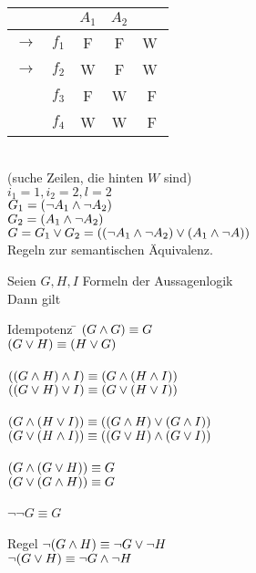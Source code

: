 \beispiel{}\\
\begin{tabular}{cc|c|c|c}
 &  & $A_1$ & $A_2$ &   \\
\hline
$\rightarrow$ & $f_1$ & F & F & \textcircled{W}\\
$\rightarrow$ & $f_2$ & W & F & \textcircled{W}\\
 & $f_3$ & F & W & F\\
 & $f_4$ & W & W & F\\
\end{tabular}\\
(suche Zeilen, die hinten $W$ sind)\\

\noindent
$i_1 = 1, i_2 = 2, l=2$\\
$G_1 = (\neg A_1 \wedge \neg A_2)$\\
$G_2 = (A_1 \wedge \neg A_2)$\\
$G = G_1 \vee G_2 = (( \neg A_1 \wedge \neg A_2) \vee (A_1 \wedge \neg A))$\\

\vspace{1cm}
\noindent
Regeln zur semantischen Äquivalenz.

 Seien $G, H, I$ Formeln der Aussagenlogik\\
Dann gilt
\begin{tabbing}
Idempotenz \hspace{1cm} \= $(G \wedge G) \equiv G$\\
\> $(G \vee H) \equiv (H \vee G)$\\
\\
 \> $((G \wedge H) \wedge I ) \equiv (G \wedge (H \wedge I))$\\
\> $((G \vee H) \vee I) \equiv (G \vee (H \vee I ))$\\
\\
 \> $(G \wedge ( H \vee I )) \equiv ((G \wedge H ) \vee (G \wedge I ))$\\
\> $(G \vee ( H \wedge I )) \equiv (( G \vee H ) \wedge ( G \vee I ))$\\
\\
 \> $(G \wedge ( G \vee H )) \equiv G$\\
\> $(G \vee ( G \wedge H )) \equiv G$\\
\\
 \> $\neg \neg G \equiv G$\\
\\
 Regel \> $\neg ( G \wedge H ) \equiv \neg G \vee \neg H$\\
\> $\neg ( G \vee H) \equiv \neg G \wedge \neg H$
\end{tabbing}

